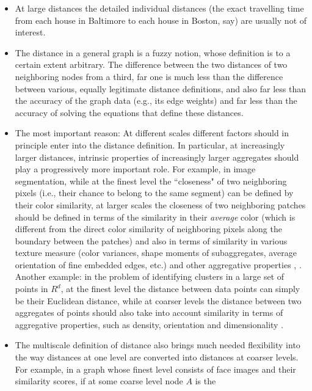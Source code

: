 \documentclass[final]{siamltex}
\begin{document}
\begin{itemize}
    \item At large distances the detailed individual distances (the exact travelling time from each house in Baltimore to each house in Boston, say)
    are usually not of interest.
    \item The distance in a general graph is a fuzzy notion, whose
    definition is to a certain  extent arbitrary. The difference
    between the two distances of two neighboring nodes from a
    third, far one is much less than the difference between various,
    equally legitimate distance definitions, and also far less than the
    accuracy of the graph data (e.g., its edge weights) and far
    less than the accuracy of solving the equations that define these
    distances.
    \item The most important reason: At different scales different
    factors should in principle enter into the distance
    definition. In particular, at increasingly larger distances,
    intrinsic properties of increasingly larger aggregates should
    play a progressively more important role. For example, in image
    segmentation, while at the finest level the ``closeness"  of
    two neighboring pixels (i.e., their chance to belong to the same
    segment) can be defined by their color similarity, at larger
    scales the closeness of two neighboring patches should be
    defined in terms of the similarity in their {\it average}
    color (which is different from the direct color similarity of
    neighboring pixels along the boundary between the patches) and also in
    terms of similarity in various texture measure (color variances,
    shape moments of subaggregates, average orientation of fine embedded
    edges, etc.) and other aggregative properties \cite{segm}, \cite{Nature}. Another example: in the
    problem of identifying clusters in a large set of points in
    $R^d$, at the finest level the distance between data points
    can simply be their Euclidean distance, while at coarser
    levels the distance between two aggregates of points should
    also take into account similarity in terms of aggregative
    properties, such as density, orientation and  dimensionality     \cite{Dan1}.
    \item The multiscale definition of distance also brings much
    needed flexibility into the way distances at one level are
    converted into distances at coarser levels. For example, in a
    graph whose finest level consists of face images and their
    similarity scores, if at some coarse level node $A$ is the

\end{itemize}
\end{document}
